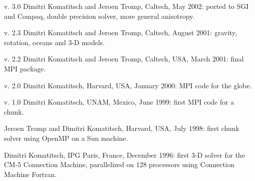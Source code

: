  v. 3.0 Dimitri Komatitsch and Jeroen Tromp, Caltech, May 2002:
   ported to SGI and Compaq, double precision solver, more general anisotropy.\newline

 v. 2.3 Dimitri Komatitsch and Jeroen Tromp, Caltech, August 2001:
                       gravity, rotation, oceans and 3-D models.\newline

 v. 2.2 Dimitri Komatitsch and Jeroen Tromp, Caltech, USA, March 2001:
                       final MPI package.\newline

 v. 2.0 Dimitri Komatitsch, Harvard, USA, January 2000: MPI code for the globe.\newline

 v. 1.0 Dimitri Komatitsch, UNAM, Mexico, June 1999: first MPI code for a chunk.\newline

 Jeroen Tromp and Dimitri Komatitsch, Harvard, USA, July 1998: first chunk solver using OpenMP on a Sun machine.\newline

 Dimitri Komatitsch, IPG Paris, France, December 1996: first 3-D solver for the CM-5 Connection Machine,
    parallelized on 128 processors using Connection Machine Fortran.\newline


